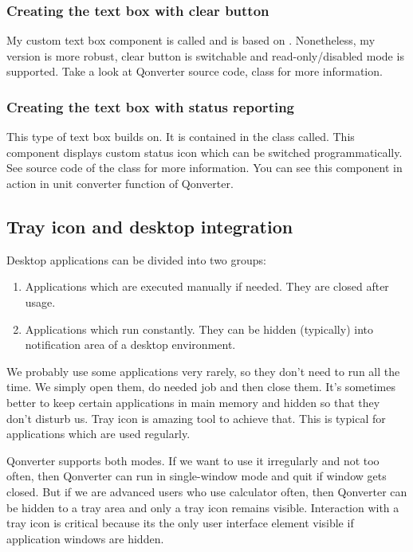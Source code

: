 \subsubsection{Creating the text box with clear button}
My custom text box component is called and is based on \citep{various:qclear}. Nonetheless, my version is more robust, clear button is switchable and read-only/disabled mode is supported. Take a look at Qonverter source code, class for more information.

\subsubsection{Creating the text box with status reporting}
This type of text box builds on. It is contained in the class called. This component displays custom status icon which can be switched programmatically. See source code of the class for more information. You can see this component in action in unit converter function of Qonverter.

\subsection{Tray icon and desktop integration}
Desktop applications can be divided into two groups:
\begin{enumerate}
\item Applications which are executed manually if needed. They are closed after usage.
\item Applications which run constantly. They can be hidden (typically) into notification area of a desktop environment.
\end{enumerate}

We probably use some applications very rarely, so they don't need to run all the time. We simply open them, do needed job and then close them. It's sometimes better to keep certain applications in main memory and hidden so that they don't disturb us. Tray icon is amazing tool to achieve that. This is typical for applications which are used regularly.

Qonverter supports both modes. If we want to use it irregularly and not too often, then Qonverter can run in single-window mode and quit if window gets closed. But if we are advanced users who use calculator often, then Qonverter can be hidden to a tray area and only a tray icon remains visible. Interaction with a tray icon is critical because its the only user interface element visible if application windows are hidden.

